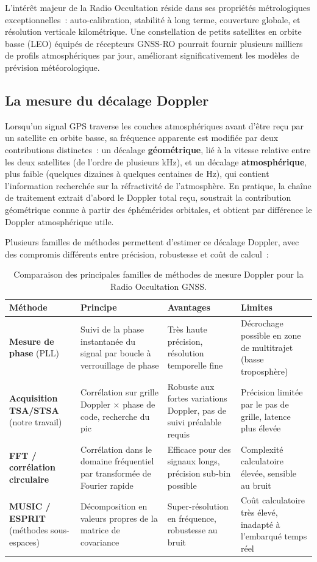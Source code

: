 \documentclass[11pt,a4paper]{article}
\begin{document}
L'intérêt majeur de la Radio Occultation réside dans ses propriétés métrologiques exceptionnelles~: auto-calibration, stabilité à long terme, couverture globale, et résolution verticale kilométrique. Une constellation de petits satellites en orbite basse (LEO) équipés de récepteurs GNSS-RO pourrait fournir plusieurs milliers de profils atmosphériques par jour, améliorant significativement les modèles de prévision météorologique.

\subsection{La mesure du décalage Doppler}

Lorsqu'un signal GPS traverse les couches atmosphériques avant d'être reçu par un satellite en orbite basse, sa fréquence apparente est modifiée par deux contributions distinctes~: un décalage \textbf{géométrique}, lié à la vitesse relative entre les deux satellites (de l'ordre de plusieurs kHz), et un décalage \textbf{atmosphérique}, plus faible (quelques dizaines à quelques centaines de Hz), qui contient l'information recherchée sur la réfractivité de l'atmosphère. En pratique, la chaîne de traitement extrait d'abord le Doppler total reçu, soustrait la contribution géométrique connue à partir des éphémérides orbitales, et obtient par différence le Doppler atmosphérique utile.

Plusieurs familles de méthodes permettent d'estimer ce décalage Doppler, avec des compromis différents entre précision, robustesse et coût de calcul~:

\begin{table}[H]
\centering
\renewcommand{\arraystretch}{1.4}
\begin{tabular}{p{3.0cm}p{3.5cm}p{3.5cm}p{2.5cm}}
\toprule
\textbf{Méthode} & \textbf{Principe} & \textbf{Avantages} & \textbf{Limites} \\
\midrule
\textbf{Mesure de phase} (PLL) &
Suivi de la phase instantanée du signal par boucle à verrouillage de phase &
Très haute précision, résolution temporelle fine &
Décrochage possible en zone de multitrajet (basse troposphère) \\
\midrule
\textbf{Acquisition TSA/STSA} (notre travail) &
Corrélation sur grille Doppler $\times$ phase de code, recherche du pic &
Robuste aux fortes variations Doppler, pas de suivi préalable requis &
Précision limitée par le pas de grille, latence plus élevée \\
\midrule
\textbf{FFT / corrélation circulaire} &
Corrélation dans le domaine fréquentiel par transformée de Fourier rapide &
Efficace pour des signaux longs, précision sub-bin possible &
Complexité calculatoire élevée, sensible au bruit \\
\midrule
\textbf{MUSIC / ESPRIT} (méthodes sous-espaces) &
Décomposition en valeurs propres de la matrice de covariance &
Super-résolution en fréquence, robustesse au bruit &
Coût calculatoire très élevé, inadapté à l'embarqué temps réel \\
\bottomrule
\end{tabular}
\caption{Comparaison des principales familles de méthodes de mesure Doppler pour la Radio Occultation GNSS.}
\end{table}
\end{document}
